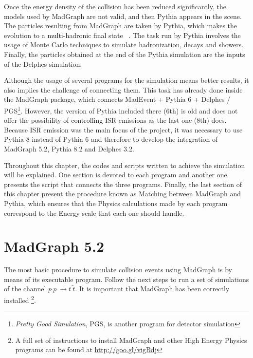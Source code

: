 \documentclass[12pt, oneside]{book}              %
\begin{document}
Once the energy density of the collision has been reduced significantly, the models used
by MadGraph are not valid, and then Pythia appears in the scene. The particles resulting
from MadGraph are taken by Pythia, which makes the evolution to a multi-hadronic final
state ~\cite{Sjostrand:2014zea}. The task run by Pythia involves the usage of Monte
Carlo techniques to simulate hadronization, decays and showers. Finally, the particles
obtained at the end of the Pythia simulation are the inputs of the Delphes simulation.

Although the usage of several programs for the simulation means better results, it also
implies the challenge of connecting them. This task has already done inside the MadGraph
package, which connects MadEvent + Pythia 6 + Delphes / PGS\footnote{\textit{Pretty 
Good Simulation}, PGS, is another program for detector simulation}. However, the version
of Pythia included there (6th) is old and does not offer the possibility of controlling 
ISR emissions as the last one (8th) does. Because ISR emission was the main focus of the 
project, it was necessary to use Pythia 8 instead of Pythia 6 and therefore to develop
the integration of MadGraph 5.2, Pythia 8.2 and Delphes 3.2.

Throughout this chapter, the codes and scripts written to achieve the simulation will
be explained. One section is devoted to each program and another one presents the
script that connects the three programs. Finally, the last section of this chapter
present the procedure known as Matching between MadGraph and Pythia, which ensures that
the Physics calculations made by each program correspond to the Energy scale that
each one should handle.

\section{MadGraph 5.2} \label{sec:MadGraph}

The most basic procedure to simulate collision events using MadGraph is by means of its
executable program. Follow the next steps to run a set of simulations of the channel
$ p\ p\ \to t\ \tilde{t} $. It is important that MadGraph has been correctly installed
\footnote{A full set of instructions to install MadGraph and other High Energy Physics
programs can be found at \url{http://goo.gl/vigBdj}}.
\end{document}
